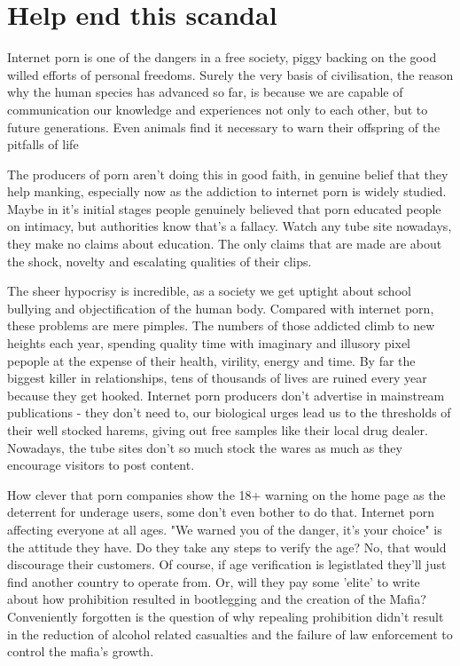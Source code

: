 \documentclass[easypeasy.tex]{subfiles}
\begin{document}
\section{Help end this scandal}

Internet porn is one of the dangers in a free society, piggy backing on the good willed efforts of personal freedoms. Surely the very basis of civilisation, the reason why the human species has advanced so far, is because we are capable of communication our knowledge and experiences not only to each other, but to future generations. Even animals find it necessary to warn their offspring of the pitfalls of life

The producers of porn aren't doing this in good faith, in genuine belief that they help manking, especially now as the addiction to internet porn is widely studied. Maybe in it's initial stages people genuinely believed that porn educated people on intimacy, but authorities know that's a fallacy. Watch any tube site nowadays, they make no claims about education. The only claims that are made are about the shock, novelty and escalating qualities of their clips.

The sheer hypocrisy is incredible, as a society we get uptight about school bullying and objectification of the human body. Compared with internet porn, these problems are mere pimples. The numbers of those addicted climb to new heights each year, spending quality time with imaginary and illusory pixel pepople at the expense of their health, virility, energy and time. By far the biggest killer in relationships, tens of thousands of lives are ruined every year because they get hooked. Internet porn producers don't advertise in mainstream publications - they don't need to, our biological urges lead us to the thresholds of their well stocked harems, giving out free samples like their local drug dealer. Nowadays, the tube sites don't so much stock the wares as much as they encourage visitors to post content.

How clever that porn companies show the 18+ warning on the home page as the deterrent for underage users, some don't even bother to do that. Internet porn affecting everyone at all ages. "We warned you of the danger, it's your choice" is the attitude they have. Do they take any steps to verify the age? No, that would discourage their customers. Of course, if age verification is legistlated they'll just find another country to operate from. Or, will they pay some 'elite' to write about how prohibition resulted in bootlegging and the creation of the Mafia? Conveniently forgotten is the question of why repealing prohibition didn't result in the reduction of alcohol related casualties and the failure of law enforcement to control the mafia's growth.
\end{document}
